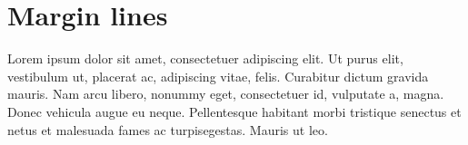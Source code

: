 \section{Margin lines}

Lorem ipsum dolor sit amet, consectetuer adipiscing elit. Ut purus elit, vestibulum ut, placerat ac, adipiscing vitae, felis. Curabitur dictum gravida mauris. Nam arcu libero, nonummy eget, consectetuer id, vulputate a, magna. Donec vehicula augue eu neque. Pellentesque habitant morbi tristique senectus et netus et malesuada fames ac turpisegestas. Mauris ut leo.
